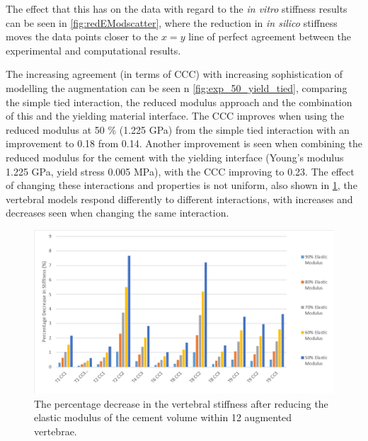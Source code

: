 The effect that this has on the data with regard to the \textit{in vitro}
stiffness results can be seen in \cref{fig:redEModscatter}, where the reduction
in \textit{in silico} stiffness moves the data points closer to the $x = y$
line of perfect agreement between the experimental and computational results.

The increasing agreement (in terms of CCC) with increasing sophistication of
modelling the augmentation can be seen n \cref{fig:exp_50_yield_tied},
comparing the simple tied interaction, the reduced modulus approach and the
combination of this and the yielding material interface.  The CCC improves when
using the reduced modulus at 50 \% (1.225 GPa) from the simple tied interaction
with an improvement to 0.18 from 0.14.  Another improvement is seen when
combining the reduced modulus for the cement with the yielding interface
(Young's modulus 1.225 GPa, yield stress 0.005 MPa), with the CCC improving to
0.23.  The effect of changing these interactions and properties is not uniform,
also shown in \cref{fig:redEModBar}, the vertebral models respond differently
to different interactions, with increases and decreases seen when changing the
same interaction.

\begin{figure}[ht!]
\centering
\includegraphics[width=\textwidth]{images/reductionOfEMod_Bar.png}
\caption{The percentage decrease in the vertebral stiffness after reducing the elastic modulus of the cement volume within 12 augmented vertebrae.}
\label{fig:redEModBar}
\end{figure}

